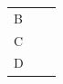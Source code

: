 {\begin{tabular}[t]{|l|l|l|}
    
        B &
    
    
         &
    
    
     \tabularnewline\cline{1-1}\cline{2-2}\cline{3-3}
    
    
        C &
    
    
         &
    
    
     \tabularnewline\cline{1-1}\cline{2-2}\cline{3-3}
    
    
        D &
    
    
         &
    
    

\end{tabular}}

